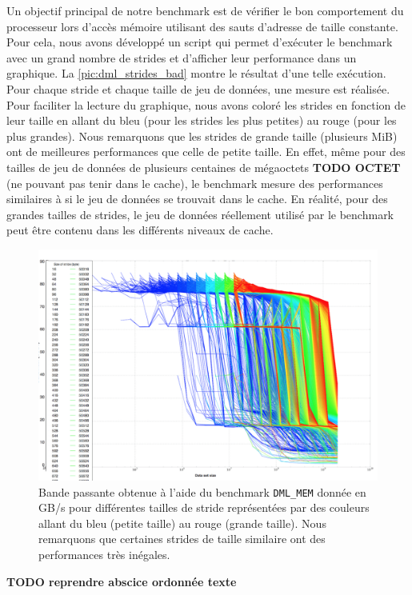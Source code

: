         Un objectif principal de notre benchmark est de vérifier le bon comportement du processeur lors d'accès mémoire utilisant des sauts d'adresse de taille constante. Pour cela, nous avons développé un script qui permet d'exécuter le benchmark avec un grand nombre de strides et d'afficher leur performance dans un graphique. La \autoref{pic:dml_strides_bad} montre le résultat d'une telle exécution. Pour chaque \gls{stride} et chaque taille de jeu de données, une mesure est réalisée. Pour faciliter la lecture du graphique, nous avons coloré les strides en fonction de leur taille en allant du bleu (pour les strides les plus petites) au rouge (pour les plus grandes). Nous remarquons que les strides de grande taille (plusieurs MiB) ont de meilleures performances que celle de petite taille. En effet, même pour des tailles de jeu de données de plusieurs centaines de mégaoctets \textbf{TODO OCTET} (ne pouvant pas tenir dans le cache), le benchmark mesure des performances similaires à si le jeu de données se trouvait dans le cache. En réalité, pour des grandes tailles de strides, le jeu de données réellement utilisé par le benchmark peut être contenu dans les différents niveaux de cache. 
      
        \begin{figure}
        \center
        \includegraphics[width=12cm]{images/dml_strides_bad.png}
        \caption{\label{pic:dml_strides_bad} Bande passante obtenue à l'aide du benchmark \texttt{DML\_MEM} donnée en GB/s pour différentes tailles de stride représentées par des couleurs allant du bleu (petite taille) au rouge (grande taille). Nous remarquons que certaines strides de taille similaire ont des performances très inégales.}
        \end{figure}
        \textbf{TODO reprendre abscice ordonnée texte}
        
